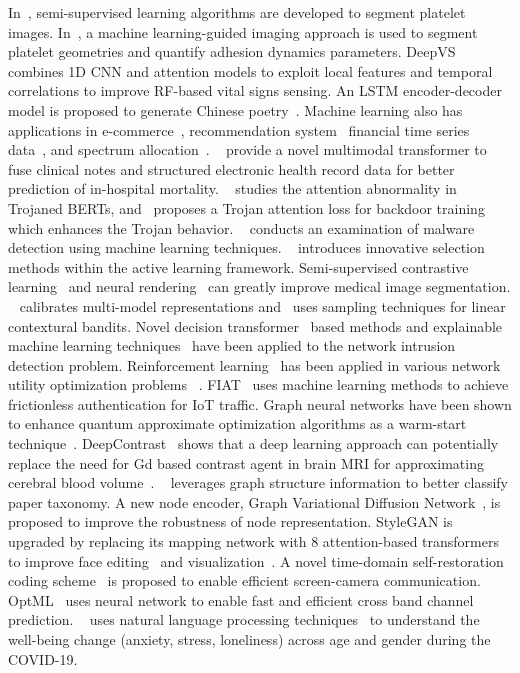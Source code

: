 In~\cite{peineng2021,peineng2021semi}, semi-supervised learning algorithms are developed to segment platelet images.
In~\cite{peineng2023}, a machine learning-guided imaging approach is used to segment platelet geometries and quantify adhesion dynamics parameters.
DeepVS~\cite{zongxing2022dl} combines 1D CNN and attention models to exploit local features and temporal correlations to improve RF-based vital signs sensing.
An LSTM encoder-decoder model is proposed to generate Chinese poetry~\cite{yubo2017text}.
Machine learning also has applications in e-commerce~\cite{kexin2023ecommerce}, recommendation system~\cite{dong2020,dong2024,dong2023recommend}
financial time series data~\cite{kexin2023financial}, and spectrum allocation~\cite{mohammad2024}.
~\cite{lyu-clinical} provide a novel multimodal transformer to fuse clinical notes and structured electronic health record data
 for better prediction of in-hospital mortality.
~\cite{lyu-2022-trojaned} studies the attention abnormality in Trojaned BERTs,
and~\cite{lyu-2023-attentionenhancing} proposes a Trojan attention loss for backdoor training which enhances
the Trojan behavior.
~\cite{zhenglin} conducts an examination of malware detection using machine learning techniques.
~\cite{hongpeng2024} introduces innovative selection methods within the active learning framework.
Semi-supervised contrastive learning~\cite{yifei2023medical} and neural rendering~\cite{yifei2023medical2} can greatly improve medical image segmentation.
~\cite{yifei2024} calibrates multi-model representations and~\cite{yifei2023samping} uses sampling techniques for linear contextural bandits.
Novel decision transformer~\cite{chen2023real} based methods and explainable machine learning techniques~\cite{chen2023ride,chen2023explainable} have been applied to the network intrusion detection problem.
Reinforcement learning~\cite{chen2023rgmcomm} has been applied in various network utility optimization problems~\cite{chen2021bringing,chen2023distributional} .
FIAT~\cite{yunming2022} uses machine learning methods to achieve frictionless authentication for IoT traffic.
Graph neural networks have been shown to enhance quantum approximate optimization algorithms as a warm-start technique~\cite{zhiding2024}.
DeepContrast~\cite{chenliu2020} shows that a deep learning approach can potentially replace the need for Gd based contrast agent in brain MRI 
for approximating cerebral blood volume~\cite{chenliu2022}.
~\cite{zhuang2024understanding} leverages graph structure information to better classify paper taxonomy.
A new node encoder, Graph Variational Diffusion Network~\cite{zhuang2023robust}, is proposed to improve the robustness of node representation.
StyleGAN is upgraded by replacing its mapping network with 8 attention-based transformers to improve face editing~\cite{xinyu2023} and visualization~\cite{xinyu_visual}.
A novel time-domain self-restoration coding scheme~\cite{yifan2019} is proposed to enable efficient screen-camera communication. 
OptML~\cite{yifan2019mobi} uses neural network to enable fast and efficient cross band channel prediction.
~\cite{huang2023mental} uses natural language processing techniques~\cite{huang2023instance} to understand the well-being change (anxiety, stress, loneliness) across age and gender during the COVID-19.


